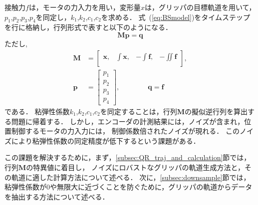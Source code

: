 \documentclass[a4paper]{jarticle}
\begin{document}
接触力$f$は，モータの力入力を用い，変形量$x$は，グリッパの目標軌道を用いて，$p_1$,$p_2$,$p_3$,$p_4$を同定し，$k_1$,$k_2$,$c_1$,$c_2$を求める．
式~(\ref{eq:BSmodel})をタイムステップを行に格納し，行列形式で表すと以下のようになる．
\begin{equation}
    \mathbf{M}\mathbf{p} = \mathbf{q} 
    \label{eq:Mp_q}
\end{equation}
ただし,
\begin{equation}
    \begin{aligned}
        \mathbf{M} &= \begin{bmatrix}
            \boldsymbol{x}, & \int{\boldsymbol{x}}, & -\int{\boldsymbol{f}}, & -\iint{\boldsymbol{f}}\\
        \end{bmatrix}, \\
        \mathbf{p}  &= \begin{bmatrix}
            p_1 \\
            p_2 \\
            p_3 \\
            p_4
        \end{bmatrix}, \quad\quad\quad\quad
        \mathbf{q}   = \boldsymbol{f}
    \end{aligned}
\label{eq:BSmodel_matrix}
\end{equation}
である．
粘弾性係数$k_1$,$k_2$,$c_1$,$c_2$を同定することは，行列$\mathbf{M}$の擬似逆行列を算出する問題に帰着する．
しかし，エンコーダの計測結果には，ノイズが含まれ，位置制御するモータの力入力には，{\color{red} 制御係数倍}されたノイズが現れる．
このノイズにより粘弾性係数の同定精度が低下するという課題がある．

この課題を解決するために，まず，\ref{subsec:QR_traj_and_calculation}節では，行列$\mathbf{M}$の特異値に着目し，
ノイズにロバストなグリッパの軌道生成方法と，その軌道に適した計算方法について述べる．
次に，\ref{subsec:downsample}節では，粘弾性係数が0や無限大に近づくことを防ぐために，グリッパの軌道からデータを抽出する方法について述べる．
\end{document}
